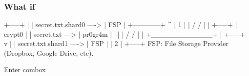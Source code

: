 \begin{frame}[fragile]
  \frametitle{What if}

  {\tiny
  \begin{semiverbatim}
                                                             +-----+
                                                             |     |
                                  secret.txt.shard0   ---->  | FSP |
                   +------------+   ^                        |  1  |
                   |  /     /   |   |                        +-----+
                   |  crypt0    |   |
   secret.txt ---> |  pr0gr4m   | --|
                   | /     /    |   |
                   +____________+   |                        +-----+
                                    v                        |     |
                                  secret.txt.shard1   ---->  | FSP |
                                                             |  2  |
                                                             +-----+
FSP: File Storage Provider (Dropbox, Google Drive, etc).
  \end{semiverbatim}
  }

\end{frame}

\begin{frame}
  \centering
  Enter combox
\end{frame}
